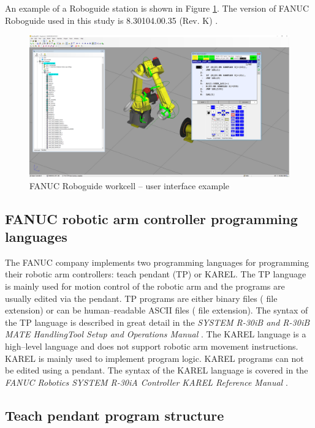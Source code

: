 An example of a Roboguide station is shown in Figure \ref{fig:roboguide}. The version of FANUC Roboguide used in this study is 8.30104.00.35 (Rev. K) \cite{roboguide}. 

\begin{figure}[h]
    \centering
    \includegraphics[width=0.9\linewidth]{img/roboguide.PNG}
    \caption{FANUC Roboguide workcell -- user interface example}
    \label{fig:roboguide}
\end{figure}

\subsection{FANUC robotic arm controller programming languages}

The FANUC company implements two programming languages for programming their robotic arm controllers: teach pendant (TP) or KAREL. The TP language is mainly used for motion control of the robotic arm and the programs are usually edited via the pendant. TP programs are either binary files ( file extension) or can be human--readable ASCII files ( file extension). The syntax of the TP language is described in great detail in the \emph{SYSTEM R-30iB and R-30iB MATE HandlingTool Setup and Operations Manual} \cite{fanuchandling}. The KAREL language is a high--level language and does not support robotic arm movement instructions. KAREL is mainly used to implement program logic. KAREL programs can not be edited using a pendant. The syntax of the KAREL language is covered in the \emph{FANUC Robotics SYSTEM R-30iA Controller KAREL Reference Manual} \cite{karelmanual}.



\subsection{Teach pendant program structure}

